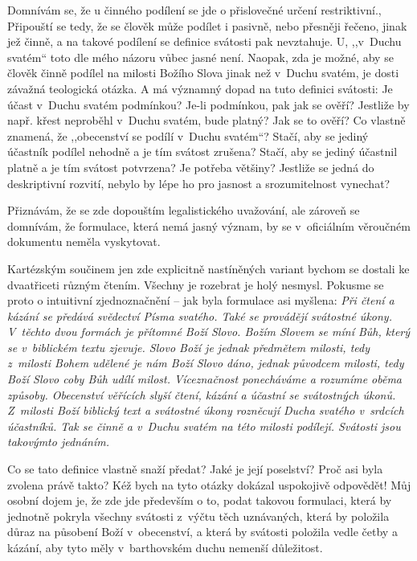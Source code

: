 Domnívám se, že u činného podílení se jde o přislovečné určení restriktivní.,
Připouští se tedy, že se člověk může podílet i pasivně, nebo přesněji řečeno,
jinak jež činně, a na takové podílení se definice svátosti pak nevztahuje. U,
,,v~Duchu svatém``  toto dle mého názoru vůbec jasné není. Naopak, zda je možné,
aby se člověk činně podílel na milosti Božího Slova jinak než v~Duchu svatém, je
dosti závažná teologická otázka. A má významný dopad na tuto definici svátosti:
Je účast v~Duchu svatém podmínkou? Je-li podmínkou, pak jak se ověří? Jestliže
by např. křest neproběhl v~Duchu svatém, bude platný? Jak se to ověří? Co
vlastně znamená, že ,,obecenství se podílí v~Duchu svatém``{}? Stačí, aby se
jediný účastník podílel nehodně a je tím svátost zrušena? Stačí, aby se jediný
účastnil platně a je tím svátost potvrzena? Je potřeba většiny? Jestliže se
jedná do deskriptivní rozvití, nebylo by lépe ho pro jasnost a srozumitelnost
vynechat?

Přiznávám, že se zde dopouštím legalistického uvažování, ale zároveň se
domnívám, že formulace, která nemá jasný význam, by se  v~oficiálním
věroučném dokumentu neměla vyskytovat.

Kartézským součinem jen zde explicitně nastíněných variant bychom se dostali ke
dvaatřiceti různým čtením. Všechny je rozebrat je holý nesmysl. Pokusme se proto o
intuitivní zjednoznačnění -- jak byla formulace asi myšlena: \textit{Při čtení a kázání
se předává svědectví Písma svatého. Také se provádějí svátostné úkony. V~těchto
dvou formách je přítomné Boží Slovo. Božím Slovem se míní Bůh, který se
v~biblickém textu zjevuje. Slovo Boží je jednak předmětem milosti, tedy
z~milosti Bohem udělené je nám Boží Slovo dáno, jednak původcem milosti, tedy
Boží Slovo coby Bůh udílí milost. Víceznačnost ponecháváme a rozumíme oběma
způsoby. Obecenství věřících slyší čtení, kázání a účastní se svátostných úkonů.
Z~milosti Boží biblický text a svátostné úkony rozněcují Ducha svatého v~srdcích
účastníků. Tak se činně a v~Duchu svatém  na této  milosti podílejí. Svátosti
jsou takovýmto jednáním.}

Co se tato definice vlastně snaží předat? Jaké je její poselství? Proč asi byla
zvolena právě takto? Kéž bych na tyto otázky dokázal uspokojivě odpovědět! Můj
osobní dojem je, že zde jde především o to, podat takovou formulaci, která by
jednotně pokryla všechny svátosti z~výčtu těch uznávaných, která by položila
důraz na působení Boží v~obecenství, a která by svátosti položila vedle četby a
kázání, aby tyto měly v~barthovském duchu nemenší důležitost.

